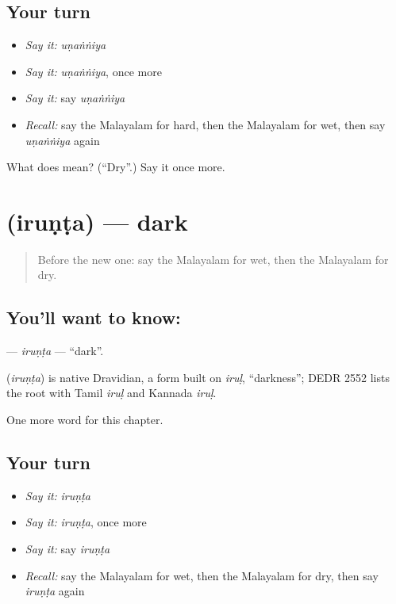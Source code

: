 \subsection*{Your turn}
\begin{itemize}
\raggedright
  \item \emph{Say it:} \emph{uṇaṅṅiya}
  \item \emph{Say it:} \emph{uṇaṅṅiya}, once more
  \item \emph{Say it:} say \emph{uṇaṅṅiya}
  \item \emph{Recall:} say the Malayalam for hard, then the Malayalam for wet, then say \emph{uṇaṅṅiya} again
\end{itemize}

\begin{tcolorbox}[breakable,colback=teal!4,colframe=teal!35!black,title={Before you move on}]
What does  mean? (\textquotedblleft{}Dry\textquotedblright{}.) Say it once more.
\end{tcolorbox}
\section[\texorpdfstring{\ml{ഇരുണ്ട} (iruṇṭa)}{ഇരുണ്ട (iruṇṭa)}]{ (iruṇṭa) — dark}

\label{lesson:ML-C167-irunta}



\begin{quote}
Before the new one: say the Malayalam for wet, then the Malayalam for dry.
\end{quote}

\subsection*{You'll want to know: }
\textbf{} — \emph{iruṇṭa} — \textquotedblleft{}dark\textquotedblright{}.

\begin{cousinweb}
\textbf{} (\emph{iruṇṭa}) is native Dravidian, a form built on \emph{iruḷ}, \textquotedblleft{}darkness\textquotedblright{}; DEDR 2552 lists the root with Tamil \emph{iruḷ} and Kannada \emph{iruḷ}.
\end{cousinweb}

\begin{grammarlens}[title={What you've built}]
One more word for this chapter.
\end{grammarlens}

\subsection*{Your turn}
\begin{itemize}
\raggedright
  \item \emph{Say it:} \emph{iruṇṭa}
  \item \emph{Say it:} \emph{iruṇṭa}, once more
  \item \emph{Say it:} say \emph{iruṇṭa}
  \item \emph{Recall:} say the Malayalam for wet, then the Malayalam for dry, then say \emph{iruṇṭa} again
\end{itemize}

